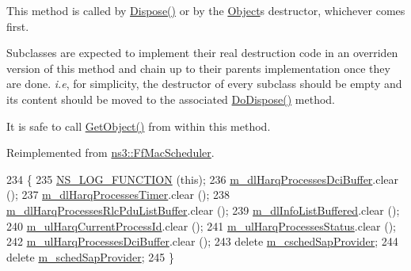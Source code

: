 This method is called by \hyperlink{classns3_1_1Object_aa90ae598863f6c251cdab3c3722afdaf}{Dispose()} or by the \hyperlink{classns3_1_1Object}{Object}\textquotesingle{}s destructor, whichever comes first.

Subclasses are expected to implement their real destruction code in an overriden version of this method and chain up to their parent\textquotesingle{}s implementation once they are done. {\itshape i.\+e}, for simplicity, the destructor of every subclass should be empty and its content should be moved to the associated \hyperlink{classns3_1_1TdBetFfMacScheduler_af4a7dc1adfe243c4b73b8fba9d3ab1f1}{Do\+Dispose()} method.

It is safe to call \hyperlink{classns3_1_1Object_a13e18c00017096c8381eb651d5bd0783}{Get\+Object()} from within this method. 

Reimplemented from \hyperlink{classns3_1_1FfMacScheduler_a771411e455992b81d8399681779debd9}{ns3\+::\+Ff\+Mac\+Scheduler}.


\begin{DoxyCode}
234 \{
235   \hyperlink{log-macros-disabled_8h_a90b90d5bad1f39cb1b64923ea94c0761}{NS\_LOG\_FUNCTION} (\textcolor{keyword}{this});
236   \hyperlink{classns3_1_1TdBetFfMacScheduler_a94ed0382052c7b9665c5f04bce88fe6e}{m\_dlHarqProcessesDciBuffer}.clear ();
237   \hyperlink{classns3_1_1TdBetFfMacScheduler_a6421f37924ac8b08b528aec9e7386678}{m\_dlHarqProcessesTimer}.clear ();
238   \hyperlink{classns3_1_1TdBetFfMacScheduler_a066bceddaca3ed4a25974ada3aba3028}{m\_dlHarqProcessesRlcPduListBuffer}.clear ();
239   \hyperlink{classns3_1_1TdBetFfMacScheduler_ad28a9447cadd7f80c4fe5d3801d8828b}{m\_dlInfoListBuffered}.clear ();
240   \hyperlink{classns3_1_1TdBetFfMacScheduler_a0776a2fc3f7186d7ec4491dc21706596}{m\_ulHarqCurrentProcessId}.clear ();
241   \hyperlink{classns3_1_1TdBetFfMacScheduler_a41bae8c97c560b2a314650d7e99bd356}{m\_ulHarqProcessesStatus}.clear ();
242   \hyperlink{classns3_1_1TdBetFfMacScheduler_a24641ddb697d45df50ee7bcaaacdb1e1}{m\_ulHarqProcessesDciBuffer}.clear ();
243   \textcolor{keyword}{delete} \hyperlink{classns3_1_1TdBetFfMacScheduler_a9c1827706381efe9cb15b1cdd0166ecc}{m\_cschedSapProvider};
244   \textcolor{keyword}{delete} \hyperlink{classns3_1_1TdBetFfMacScheduler_a756f79b8f29e6c52fb105fd75444da36}{m\_schedSapProvider};
245 \}
\end{DoxyCode}
